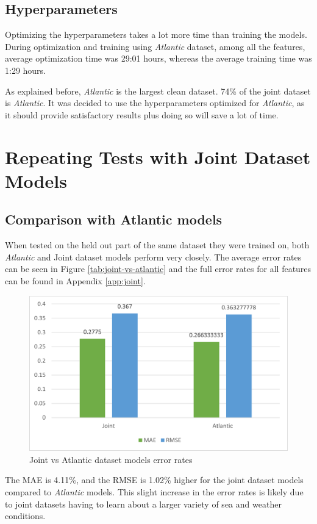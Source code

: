 \documentclass[12pt,twoside]{report}
\begin{document}
\subsection{Hyperparameters}
Optimizing the hyperparameters takes a lot more time than training the models. During optimization and training using \textit{Atlantic} dataset, among all the features, average optimization time was 29:01 hours, whereas the average training time was 1:29 hours.

As explained before, \textit{Atlantic} is the largest clean dataset. 74\% of the joint dataset is \textit{Atlantic}. It was decided to use the hyperparameters optimized for \textit{Atlantic}, as it should provide satisfactory results plus doing so will save a lot of time.

\section{Repeating Tests with Joint Dataset Models}

\subsection{Comparison with Atlantic models}
When tested on the held out part of the same dataset they were trained on, both \textit{Atlantic} and Joint dataset models perform very closely. The average error rates can be seen in Figure \ref{tab:joint-vs-atlantic} and the full error rates for all features can be found in Appendix \ref{app:joint}.

\begin{figure}[htbp]
\centering
\includegraphics[width = 0.7\hsize]{figures/joint-models/joint-vs-atlantic.png}
\caption{Joint vs Atlantic dataset models error rates}
\label{fig:joint-vs-atlantic}
\end{figure}

The MAE is 4.11\%, and the RMSE is 1.02\% higher for the joint dataset models compared to \textit{Atlantic} models. This slight increase in the error rates is likely due to joint datasets having to learn about a larger variety of sea and weather conditions.
\end{document}
